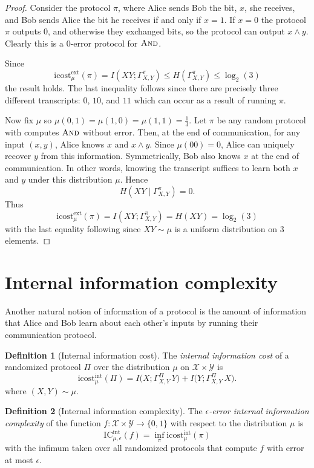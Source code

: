 \documentclass[11pt]{amsart}
\theoremstyle{plain}
\theoremstyle{definition}
\newtheorem{definition}{Definition}
\theoremstyle{plain}
\newcommand{\calX}{\mathcal{X}}
\newcommand{\calY}{\mathcal{Y}}
\newcommand{\ICint}{\mathrm{IC}^{\mathrm{int}}}
\newcommand{\icostext}{\mathrm{icost}^{\mathrm{ext}}}
\newcommand{\icostint}{\mathrm{icost}^{\mathrm{int}}}
\begin{document}
\begin{proof}
Consider the protocol $\pi$, where Alice sends Bob the bit, $x$, she receives, and Bob sends Alice the bit he receives if and only if $x=1$. If $x=0$ the protocol $\pi$ outputs $0$, and otherwise they exchanged bits, so the protocol can output $x\wedge y$. Clearly this is a $0$-error protocol for $\textsc{And}$.

Since 
$$\icostext_\mu(\pi) = I(XY; \Gamma^\pi_{X,Y}) \leq H(\Gamma^\pi_{X,Y}) \leq \log_2(3)$$
the result holds. The last inequality follows since there are precisely three different transcripts: $0$, $10$, and $11$ which can occur as a result of running $\pi$.

Now fix $\mu$ so $\mu(0,1) = \mu(1,0) = \mu(1,1) = \frac{1}{3}$. Let $\pi$ be any random protocol with computes $\textsc{And}$ without error. Then, at the end of communication, for any input $(x,y)$, Alice knows $x$ and $x\wedge y$. Since $\mu(00) = 0$, Alice can uniquely recover $y$ from this information. Symmetrically, Bob also knows $x$ at the end of communication. In other words, knowing the transcript suffices to learn both $x$ and $y$ under this distribution $\mu$. Hence
$$H(XY \mid \Gamma^\pi_{X,Y}) = 0.$$
Thus
$$\icostext_\mu(\pi) = I(XY;\Gamma^{\pi}_{X,Y}) = H(XY) =\log_2(3)$$
with the last equality following since $XY\sim \mu$ is a uniform distribution on $3$ elements.
\end{proof}


\newpage 
\section{Internal information complexity}

Another natural notion of information of a protocol is the amount of information that Alice and Bob learn about each other's inputs by running their communication protocol.

\begin{definition}[Internal information cost]
The \emph{internal information cost} of a randomized protocol $\Pi$ over the distribution $\mu$ on $\calX \times \calY$ is
\[
\icostint_\mu(\Pi) = I\big( X ; \Gamma_{X,Y}^\Pi \, Y\big) + I\big( Y ; \Gamma_{X,Y}^\Pi \, X\big).
\]
where $(X,Y) \sim \mu$.
\end{definition}

\begin{definition}[Internal information complexity]
The \emph{$\epsilon$-error internal information complexity} of the function $f : \calX \times \calY \to \{0,1\}$ with respect to the distribution $\mu$ is
\[
\ICint_{\mu,\epsilon}(f) = \inf_{\pi} \icostint_\mu(\pi)
\]
with the infimum taken over all randomized protocols that compute $f$ with error at most $\epsilon$.
\end{definition}
\end{document}
